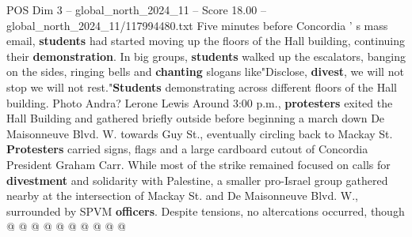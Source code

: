 \begin{textsample}{POS Dim 3 – global\_north\_2024\_11 – Score 18.00 – global\_north\_2024\_11/117994480.txt}
Five minutes before Concordia ' s mass email, \textbf{students} had started moving up the floors of the Hall building, continuing their \textbf{demonstration}.
In big groups, \textbf{students} walked up the escalators, banging on the sides, ringing bells and \textbf{chanting} slogans like"Disclose, \textbf{divest}, we will not stop we will not rest."\textbf{Students} demonstrating across different floors of the Hall building.
Photo Andra?
Lerone Lewis Around 3:00 p.m., \textbf{protesters} exited the Hall Building and gathered briefly outside before beginning a march down De Maisonneuve Blvd.
W. towards Guy St., eventually circling back to Mackay St. \textbf{Protesters} carried signs, flags and a large cardboard cutout of Concordia President Graham Carr.
While most of the strike remained focused on calls for \textbf{divestment} and solidarity with Palestine, a smaller pro-Israel group gathered nearby at the intersection of Mackay St. and De Maisonneuve Blvd.
W., surrounded by SPVM \textbf{officers}.
Despite tensions, no altercations occurred, though @ @ @ @ @ @ @ @ @ @

\end{textsample}
